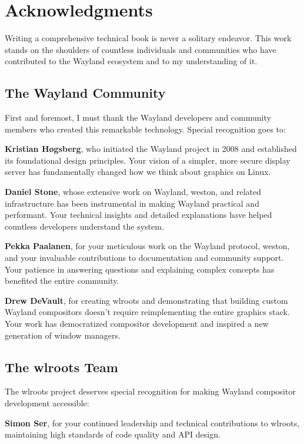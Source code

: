 
\chapter*{Acknowledgments}

Writing a comprehensive technical book is never a solitary endeavor. This work stands on the shoulders of countless individuals and communities who have contributed to the Wayland ecosystem and to my understanding of it.

\section*{The Wayland Community}

First and foremost, I must thank the Wayland developers and community members who created this remarkable technology. Special recognition goes to:

\textbf{Kristian Høgsberg}, who initiated the Wayland project in 2008 and established its foundational design principles. Your vision of a simpler, more secure display server has fundamentally changed how we think about graphics on Linux.

\textbf{Daniel Stone}, whose extensive work on Wayland, weston, and related infrastructure has been instrumental in making Wayland practical and performant. Your technical insights and detailed explanations have helped countless developers understand the system.

\textbf{Pekka Paalanen}, for your meticulous work on the Wayland protocol, weston, and your invaluable contributions to documentation and community support. Your patience in answering questions and explaining complex concepts has benefited the entire community.

\textbf{Drew DeVault}, for creating wlroots and demonstrating that building custom Wayland compositors doesn't require reimplementing the entire graphics stack. Your work has democratized compositor development and inspired a new generation of window managers.

\section*{The wlroots Team}

The wlroots project deserves special recognition for making Wayland compositor development accessible:

\textbf{Simon Ser}, for your continued leadership and technical contributions to wlroots, maintaining high standards of code quality and API design.

